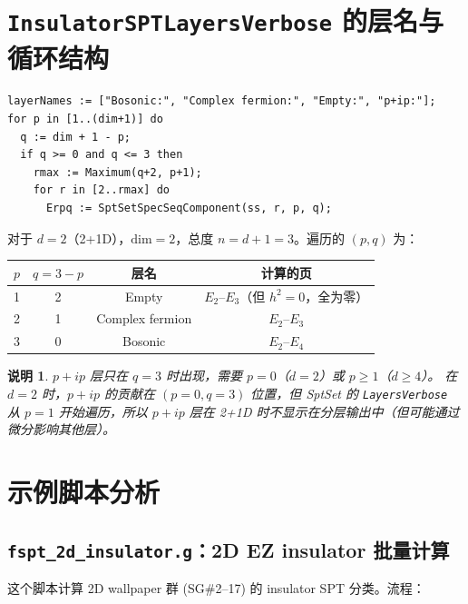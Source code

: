 \documentclass[a4paper,fontset=ubuntu,12pt]{ctexart}
\newtheorem{remark}[definition]{说明}
\begin{document}
\section{\texttt{InsulatorSPTLayersVerbose} 的层名与循环结构}
\label{sec:layers-verbose}

\begin{lstlisting}
layerNames := ["Bosonic:", "Complex fermion:", "Empty:", "p+ip:"];
for p in [1..(dim+1)] do
  q := dim + 1 - p;
  if q >= 0 and q <= 3 then
    rmax := Maximum(q+2, p+1);
    for r in [2..rmax] do
      Erpq := SptSetSpecSeqComponent(ss, r, p, q);
\end{lstlisting}

对于 $d = 2$（2+1D），$\mathrm{dim} = 2$，总度 $n = d + 1 = 3$。遍历的 $(p, q)$ 为：
\begin{center}
\begin{tabular}{c|c|c|c}
$p$ & $q = 3 - p$ & 层名 & 计算的页 \\
\hline
1 & 2 & Empty & $E_2$--$E_3$（但 $h^2=0$，全为零） \\
2 & 1 & Complex fermion & $E_2$--$E_3$ \\
3 & 0 & Bosonic & $E_2$--$E_4$ \\
\end{tabular}
\end{center}

\begin{remark}
$p+ip$ 层只在 $q = 3$ 时出现，需要 $p = 0$（$d = 2$）或 $p \geq 1$（$d \geq 4$）。
在 $d = 2$ 时，$p + ip$ 的贡献在 $(p=0, q=3)$ 位置，但 SptSet 的 \texttt{LayersVerbose} 从 $p=1$ 开始遍历，所以 $p+ip$ 层在 2+1D 时不显示在分层输出中（但可能通过微分影响其他层）。
\end{remark}

\section{示例脚本分析}
\label{sec:examples}

\subsection{\texttt{fspt\_2d\_insulator.g}：2D EZ insulator 批量计算}

这个脚本计算 2D wallpaper 群 (SG\#2--17) 的 insulator SPT 分类。流程：
\end{document}
